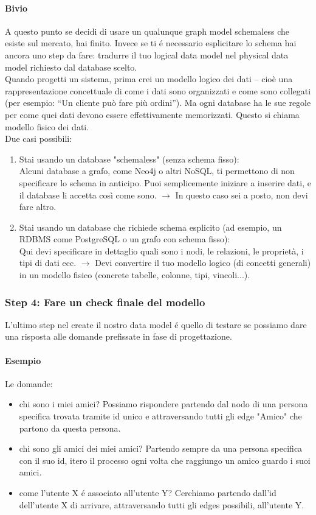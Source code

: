 \paragraph{Bivio} A questo punto se decidi di usare un qualunque graph model schemaless che esiste sul mercato, hai finito. Invece se ti é necessario esplicitare lo schema hai ancora uno step da fare: tradurre il tuo logical data model nel physical data model richiesto dal database scelto. 
\\
Quando progetti un sistema, prima crei un modello logico dei dati – cioè una rappresentazione concettuale di come i dati sono organizzati e come sono collegati (per esempio: “Un cliente può fare più ordini”). Ma ogni database ha le sue regole per come quei dati devono essere effettivamente memorizzati. Questo si chiama modello fisico dei dati.
\\
Due casi possibili:
\begin{enumerate}
    \item Stai usando un database "schemaless" (senza schema fisso): \\
    Alcuni database a grafo, come Neo4j o altri NoSQL, ti permettono di non specificare lo schema in anticipo. Puoi semplicemente iniziare a inserire dati, e il database li accetta così come sono. $\rightarrow$ In questo caso sei a posto, non devi fare altro.
    \item Stai usando un database che richiede schema esplicito (ad esempio, un RDBMS come PostgreSQL o un grafo con schema fisso): \\
    Qui devi specificare in dettaglio quali sono i nodi, le relazioni, le proprietà, i tipi di dati ecc.
    $\rightarrow$ Devi convertire il tuo modello logico (di concetti generali) in un modello fisico (concrete tabelle, colonne, tipi, vincoli...).
\end{enumerate}
    
\subsubsection*{Step 4: Fare un check finale del modello}
L'ultimo step nel create il nostro data model é quello di testare se possiamo dare una risposta alle domande prefissate in fase di progettazione. 
\paragraph{Esempio} Le domande:
\begin{itemize}
    \item chi sono i miei amici? Possiamo rispondere partendo dal nodo di una persona specifica trovata tramite id unico e attraversando tutti gli edge "Amico" che partono da questa persona. 
    \item chi sono gli amici dei miei amici? Partendo sempre da una persona specifica con il suo id, itero il processo ogni volta che raggiungo un amico guardo i suoi amici. 
    \item come l'utente X é associato all'utente Y? Cerchiamo partendo dall'id dell'utente X di arrivare, attraversando tutti gli edges possibili, all'utente Y.
\end{itemize}

